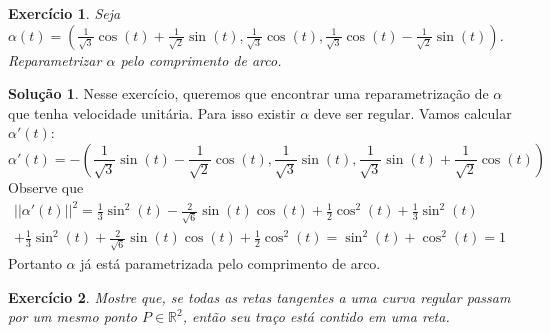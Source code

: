 \documentclass[a4paper,12pt]{article}
\newcommand{\R}{\mathbb{R}}
\theoremstyle{exer}
\newtheorem{exercise}{Exercício}
\theoremstyle{definition}
\newtheorem{solution}{Solução}
\theoremstyle{plain}
\begin{document}
\begin{exercise}
    Seja $\alpha(t) = \left(\frac{1}{\sqrt{3}}\cos(t) + \frac{1}{\sqrt{2}}\sin(t),
    \frac{1}{\sqrt{3}}\cos(t), \frac{1}{\sqrt{3}}\cos(t) -
    \frac{1}{\sqrt{2}}\sin(t)\right)$. Reparametrizar $\alpha$ pelo
    comprimento de arco.
\end{exercise}

\begin{solution}
    Nesse exercício, queremos que encontrar uma reparametrização de $\alpha$
    que tenha velocidade unitária. Para isso existir $\alpha$ deve ser
    regular. Vamos calcular $\alpha '(t)$: 
    $$ 
    \alpha '(t) = -\left(\frac{1}{\sqrt{3}}\sin(t) - \frac{1}{\sqrt{2}}\cos(t), \frac{1}{\sqrt{3}}\sin(t), \frac{1}{\sqrt{3}}\sin(t) + \frac{1}{\sqrt{2}}\cos(t)\right)
    $$
    Observe que 
    \begin{multline}
        ||\alpha '(t)||^2 = \frac{1}{3}\sin^2(t) - \frac{2}{\sqrt{6}}\sin(t)\cos(t) + \frac{1}{2}\cos^2(t) + \frac{1}{3}\sin^2(t) \\ + \frac{1}{3}\sin^2(t) + \frac{2}{\sqrt{6}}\sin(t)\cos(t) + \frac{1}{2}\cos^2(t) = \sin^2(t) + \cos^2(t) = 1
    \end{multline}
    Portanto $\alpha$ já está parametrizada pelo comprimento de arco. 
\end{solution}

\begin{exercise}
    Mostre que, se todas as retas tangentes a uma curva regular passam por um
    mesmo ponto $P \in \R^2$, então seu traço está contido em uma reta.
\end{exercise}
\end{document}
